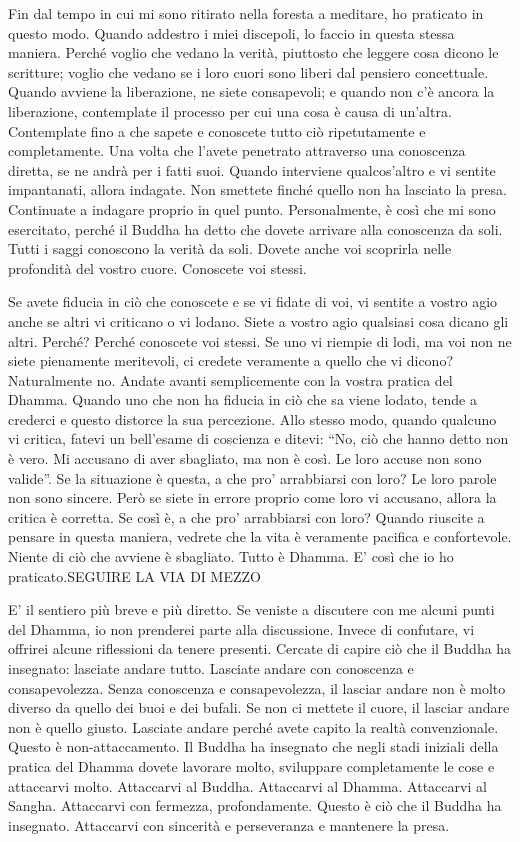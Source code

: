 Fin dal tempo in cui mi sono ritirato nella foresta a meditare, ho
praticato in questo modo. Quando addestro i miei discepoli, lo faccio in
questa stessa maniera. Perché voglio che vedano la verità, piuttosto che
leggere cosa dicono le scritture; voglio che vedano se i loro cuori sono
liberi dal pensiero concettuale. Quando avviene la liberazione, ne siete
consapevoli; e quando non c'è ancora la liberazione, contemplate il
processo per cui una cosa è causa di un'altra. Contemplate fino a che
sapete e conoscete tutto ciò ripetutamente e completamente. Una volta
che l'avete penetrato attraverso una conoscenza diretta, se ne andrà per
i fatti suoi. Quando interviene qualcos'altro e vi sentite impantanati,
allora indagate. Non smettete finché quello non ha lasciato la presa.
Continuate a indagare proprio in quel punto. Personalmente, è così che
mi sono esercitato, perché il Buddha ha detto che dovete arrivare alla
conoscenza da soli. Tutti i saggi conoscono la verità da soli. Dovete
anche voi scoprirla nelle profondità del vostro cuore. Conoscete voi
stessi.

Se avete fiducia in ciò che conoscete e se vi fidate di voi, vi sentite
a vostro agio anche se altri vi criticano o vi lodano. Siete a vostro
agio qualsiasi cosa dicano gli altri. Perché? Perché conoscete voi
stessi. Se uno vi riempie di lodi, ma voi non ne siete pienamente
meritevoli, ci credete veramente a quello che vi dicono? Naturalmente
no. Andate avanti semplicemente con la vostra pratica del Dhamma. Quando
uno che non ha fiducia in ciò che sa viene lodato, tende a crederci e
questo distorce la sua percezione. Allo stesso modo, quando qualcuno vi
critica, fatevi un bell'esame di coscienza e ditevi: ``No, ciò che hanno
detto non è vero. Mi accusano di aver sbagliato, ma non è così. Le loro
accuse non sono valide''. Se la situazione è questa, a che pro'
arrabbiarsi con loro? Le loro parole non sono sincere. Però se siete in
errore proprio come loro vi accusano, allora la critica è corretta. Se
così è, a che pro' arrabbiarsi con loro? Quando riuscite a pensare in
questa maniera, vedrete che la vita è veramente pacifica e confortevole.
Niente di ciò che avviene è sbagliato. Tutto è Dhamma. E' così che io ho
praticato.SEGUIRE LA VIA DI MEZZO

E' il sentiero più breve e più diretto. Se veniste a discutere con me
alcuni punti del Dhamma, io non prenderei parte alla discussione. Invece
di confutare, vi offrirei alcune riflessioni da tenere presenti. Cercate
di capire ciò che il Buddha ha insegnato: lasciate andare tutto.
Lasciate andare con conoscenza e consapevolezza. Senza conoscenza e
consapevolezza, il lasciar andare non è molto diverso da quello dei buoi
e dei bufali. Se non ci mettete il cuore, il lasciar andare non è quello
giusto. Lasciate andare perché avete capito la realtà convenzionale.
Questo è non-attaccamento. Il Buddha ha insegnato che negli stadi
iniziali della pratica del Dhamma dovete lavorare molto, sviluppare
completamente le cose e attaccarvi molto. Attaccarvi al Buddha.
Attaccarvi al Dhamma. Attaccarvi al Sangha. Attaccarvi con fermezza,
profondamente. Questo è ciò che il Buddha ha insegnato. Attaccarvi con
sincerità e perseveranza e mantenere la presa.

